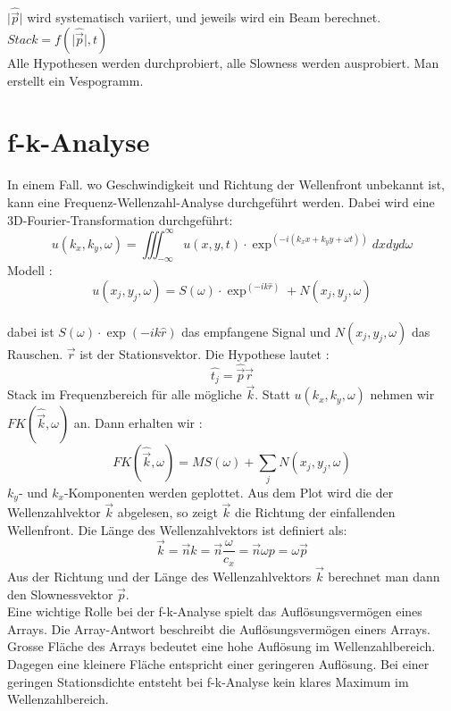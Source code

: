 $\vert\hat\vec{p}\vert$ wird systematisch variiert, und jeweils wird ein Beam berechnet.\\
$Stack = f(\vert\hat{\vec{p}}\vert,t)$\\
Alle Hypothesen werden durchprobiert, alle Slowness werden ausprobiert.  Man erstellt ein Vespogramm. 

\section{f-k-Analyse}
In einem Fall. wo Geschwindigkeit und Richtung der Wellenfront unbekannt ist, kann eine Frequenz-Wellenzahl-Analyse durchgeführt werden. Dabei wird eine 3D-Fourier-Transformation durchgeführt:
\begin{equation}
u(k_{x},k_{y},\omega) = \iiint_{-\infty}^{\infty} u(x,y,t)\cdot\exp^{(-i(k_{x}x+k_{y}y+\omega t))} dxdyd\omega
\end{equation}
Modell :
\[
u(x_{j},y_{j},\omega) = S(\omega)\cdot\exp^{(-ik\hat{r})}+N(x_{j},y_{j},\omega)
\]
\\ dabei ist $S(\omega)\cdot\exp({-ik\hat{r}})$ das empfangene Signal und $N(x_{j},y_{j},\omega)$ das Rauschen.  $\vec{r}$ ist der Stationsvektor. Die Hypothese lautet : 
\[
\hat{t_{j}} = \hat{\vec{p}} \vec{r}
\]
Stack im Frequenzbereich für alle mögliche $\vec{k}$.
Statt $u(k_{x}, k_{y}, \omega)$ nehmen wir $FK(\hat{\vec{k}},\omega)$ an.
Dann erhalten wir : \begin{equation} FK(\hat{\vec{k}},\omega) = M S(\omega)+\sum_{j}N(x_{j},y_{j},\omega)
\end{equation}
$k_{y}$- und $k_{x}$-Komponenten werden geplottet. Aus dem Plot wird die der Wellenzahlvektor $\vec{k}$ abgelesen, so zeigt $\vec{k}$ die Richtung der einfallenden Wellenfront. Die Länge des Wellenzahlvektors  ist definiert als:
\begin{equation}
\vec{k} = \vec{n} k = \vec{n} \dfrac{\omega}{c_x} = \vec{n} \omega p= \omega \vec{p} 
\end{equation}
Aus der Richtung und der Länge des Wellenzahlvektors $\vec{k}$ berechnet man dann den Slownessvektor $\vec{p}$.\\
Eine wichtige Rolle bei der f-k-Analyse spielt das Auflösungsvermögen eines Arrays. Die Array-Antwort beschreibt die Auflösungsvermögen einers Arrays. Grosse Fläche des Arrays bedeutet eine hohe Auflösung im Wellenzahlbereich. Dagegen eine kleinere Fläche entspricht einer geringeren Auflösung. Bei einer geringen Stationsdichte entsteht bei f-k-Analyse kein klares Maximum im Wellenzahlbereich.
